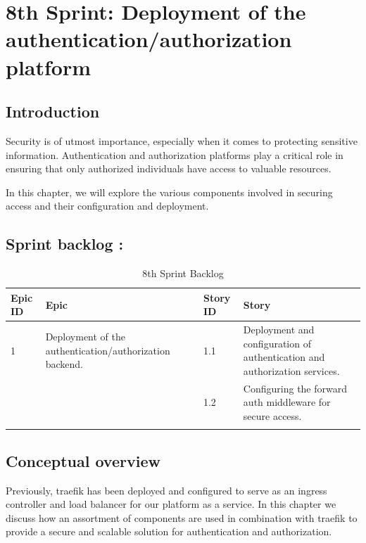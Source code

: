 \graphicspath{{./assets/}}
\setcounter{mtc}{10}
\chapter{8th Sprint: Deployment of the authentication/authorization platform }

\minitoc
\newpage
\section*{Introduction}
Security is of utmost importance, especially when it comes to protecting sensitive information. Authentication and authorization platforms play a critical role in ensuring that only authorized individuals have access to valuable resources. 

In this chapter, we will explore the various components involved in securing access and their configuration and deployment. 


\section{Sprint backlog :}

\begin{longtable}[H]{|m{1.5cm}|m{3cm}|m{1.5cm}|m{9cm}|}
\hline
{\textbf{Epic ID}} & {\textbf{Epic}} & {\textbf{Story ID}} & {\textbf{Story}}\\
\hline
1  & Deployment of the authentication/authorization backend.  &  1.1	 & Deployment and configuration of authentication and authorization services.\\
\cline{3-4}
& & 1.2 & Configuring the forward auth middleware for secure access.  \\
\cline{3-4}
\hline
\caption{8th Sprint Backlog}
\end{longtable}

\section{Conceptual overview }

Previously, traefik has been deployed and configured to serve as an ingress controller and load balancer for our platform as a service. In this chapter we discuss how an assortment of components are used in combination with traefik to provide a secure and scalable solution for authentication and authorization. 

